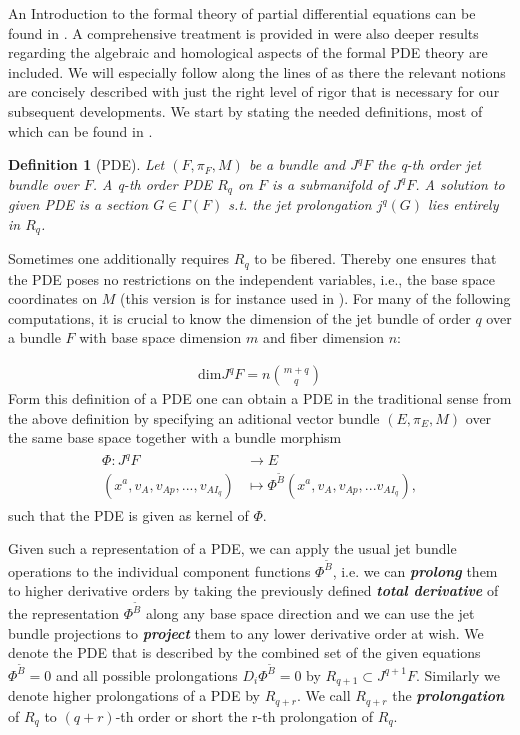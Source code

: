 \documentclass[a4paper,12pt, DIV=14, BCOR=5mm, twoside, headsepline, numbers=noenddot]{scrbook}
\newtheorem{definition}{Definition}[section]
\begin{document}
An Introduction to the formal theory of partial differential equations can be found in \cite{saunders_1989}. A comprehensive treatment is provided in \cite{seiler2009involution} were also deeper results regarding the algebraic and homological aspects of the formal PDE theory are included. We will especially follow along the lines of \cite{seiler1994analysis} as there the relevant notions are concisely described with just the right level of rigor that is necessary for our subsequent developments. We start by stating the needed definitions, most of which can be found in \cite{seiler1994analysis}.
\begin{definition}[PDE]
Let $(F,\pi_F,M)$ be a bundle and $J^qF$ the q-th order jet bundle over $F$. A q-th order PDE $R_q$ on $F$ is a  submanifold of $J^qF$. A solution to given PDE is a section $G \in \Gamma(F)$ s.t. the jet prolongation $j^q(G)$ lies entirely in $R_q$.  
\end{definition}
Sometimes one additionally requires $R_q$ to be fibered. Thereby one ensures that the PDE poses no restrictions on the independent variables, i.e., the base space coordinates on $M$ (this version is for instance used in \cite{seiler1994analysis}).
For many of the following computations, it is crucial to know the dimension of the jet bundle of order $q$ over a bundle $F$ with base space dimension $m$ and fiber dimension $n$:

\begin{align}
    \mathrm{dim}J^qF = n\binom{m+q}{q}
\end{align}
Form this definition of a PDE one can obtain a PDE in the traditional sense from the above definition by specifying an aditional vector bundle $(E,\pi_E,M)$ over the same base space together with a bundle morphism
\begin{align}
    \begin{aligned}
    \Phi : J^qF &\longrightarrow E\\
    (x^a, v_A, v_{Ap},...,v_{AI_q}) &\longmapsto \Phi^{\tilde{B}}(x^a, v_A, v_{Ap},...v_{AI_q}),
    \end{aligned}
\end{align}
such that the PDE is given as kernel of $\Phi$. 

Given such a representation of a PDE, we can apply the usual jet bundle operations to the individual component functions $\Phi^{\tilde{B}}$, i.e. we can \textit{\textbf{prolong}} them to higher derivative orders by taking the previously defined \textit{\textbf{total derivative}} of the representation $\Phi^{\tilde{B}}$ along any base space direction and we can use the jet bundle projections to \textit{\textbf{project}} them to any lower derivative order at wish. We denote the PDE that is described by the combined set of the given equations $\Phi^{\tilde{B}}=0$ and all possible prolongations $D_i\Phi^{\tilde{B}}=0$ by $R_{q+1} \subset J^{q+1}F$. Similarly we denote higher prolongations of a PDE by $R_{q+r}$. We call $R_{q+r}$ the \textit{\textbf{prolongation}} of $R_q$ to $(q+r)$-th order or short the r-th prolongation of $R_q$. 
\end{document}
